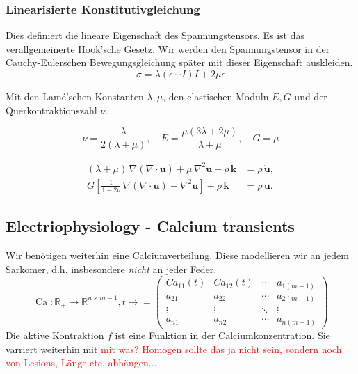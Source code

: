 \subsubsection*{Linearisierte Konstitutivgleichung}
Dies definiert die lineare Eigenschaft des Spannungstensors. Es ist das verallgemeinerte Hook'sche Gesetz. Wir werden den Spannungstensor in der Cauchy-Eulerschen Bewegungsgleichung später mit dieser Eigenschaft auskleiden.
\begin{equation*}
	\sigma = \lambda (\epsilon \cdot \cdot I) I + 2 \mu \epsilon
\end{equation*}

Mit den Lamé'schen Konstanten $\lambda, \mu$, den elastischen Moduln $E, G$ und der Querkontraktionszahl $\nu$.

\begin{equation*}
	\nu = \frac{\lambda}{2(\lambda + \mu)}, \quad E = \frac{\mu (3 \lambda + 2 \mu)}{\lambda + \mu}, \quad G = \mu
\end{equation*}

\begin{align*}
(\lambda + \mu)\,\nabla(\nabla \cdot \mathbf{u})
+ \mu\,\nabla^2 \mathbf{u}
+ \rho\,\mathbf{k}
&=
\rho\,\ddot{\mathbf{u}},
\\[1ex]
G\left[
\frac{1}{1-2\nu}\,\nabla(\nabla \cdot \mathbf{u})
+
\nabla^2 \mathbf{u}
\right]
+\rho\,\mathbf{k}
&=
\rho\,\ddot{\mathbf{u}}.
\end{align*}





\subsection*{Electriophysiology - Calcium transients}
Wir benötigen weiterhin eine Calciumverteilung. Diese modellieren wir an jedem Sarkomer, d.h. insbesondere \textit{nicht} an jeder Feder. 
\begin{equation*}
	\operatorname{Ca}: \mathbb{R}_+ \rightarrow \mathbb{R}^{n \times m-1}, t \mapsto = 
	\begin{pmatrix}
Ca_{11}(t) & Ca_{12}(t) & \cdots & a_{1(m-1)} \\
a_{21} & a_{22} & \cdots & a_{2(m-1)} \\
\vdots & \vdots & \ddots & \vdots \\
a_{n1} & a_{n2} & \cdots & a_{n(m-1)}
\end{pmatrix}
\end{equation*}
Die aktive Kontraktion $f$ ist eine Funktion in der Calciumkonzentration. Sie varriert weiterhin mit \textcolor{red}{mit was? Homogen sollte das ja nicht sein, sondern noch von Lesions, Länge etc. abhängen...}





